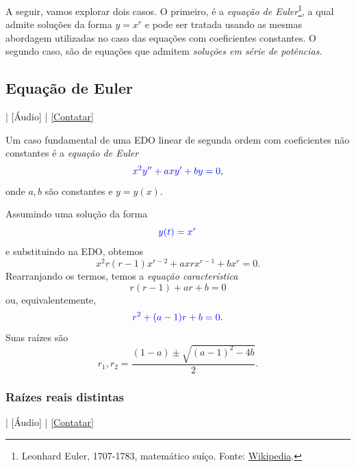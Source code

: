 A seguir, vamos explorar dois casos. O primeiro, é a \emph{equação de Euler}\footnote{Leonhard Euler, 1707-1783, matemático suíço. Fonte: \href{https://en.wikipedia.org/wiki/Leonhard_Euler}{Wikipedia}.}, a qual admite soluções da forma $y = x^r$ e pode ser tratada usando as mesmas abordagem utilizadas no caso das equações com coeficientes constantes. O segundo caso, são de equações que admitem \emph{soluções em série de potências}.

\subsection{Equação de Euler}

\begin{flushright}
  [Vídeo] | [Áudio] | \href{https://phkonzen.github.io/notas/contato.html}{[Contatar]}
\end{flushright}

Um caso fundamental de uma EDO linear de segunda ordem com coeficientes não constantes é a \emph{equação de Euler}
\begin{equation}
  {\color{blue}x^2y'' + axy' + by = 0},
\end{equation}
onde $a,b$ são constantes e $y = y(x)$.

Assumindo uma solução da forma
\begin{equation}
  {\color{blue}y(t) = x^r}
\end{equation}
e substituindo na EDO, obtemos
\begin{equation}
  x^2r(r-1)x^{r-2} + axrx^{r-1} + bx^r = 0.
\end{equation}
Rearranjando os termos, temos a \emph{equação característica}
\begin{equation}
  r(r-1) + ar + b = 0
\end{equation}
ou, equivalentemente,
\begin{equation}
  {\color{blue}r^2 + (a-1)r + b = 0}.
\end{equation}
Suas raízes são
\begin{equation}
  r_1, r_2 = \frac{(1-a)\pm\sqrt{(a-1)^2-4b}}{2}.
\end{equation}

\subsubsection{Raízes reais distintas}

\begin{flushright}
  [Vídeo] | [Áudio] | \href{https://phkonzen.github.io/notas/contato.html}{[Contatar]}
\end{flushright}

